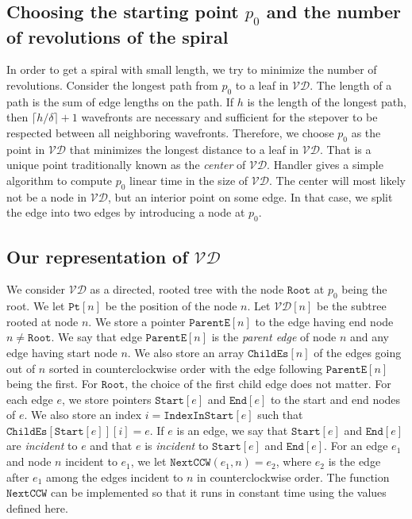 \documentclass[3p]{elsarticle}
\newcommand{\VD}{\mathcal{VD}}
\newcommand{\stepover}{\delta}
\newcommand{\parentEdge}{\texttt{ParentE}}
\newcommand{\childEdges}{\texttt{ChildEs}}
\newcommand{\nodeStart}{\texttt{Start}}
\newcommand{\nodeEnd}{\texttt{End}}
\newcommand{\indexInParentNode}{\texttt{IndexInStart}}
\newcommand{\getNextEdge}{\texttt{NextCCW}}
\newcommand{\rootNode}{\texttt{Root}}
\newcommand{\point}{\texttt{Pt}}
\begin{document}
\subsection{Choosing the starting point $p_0$ and the number of revolutions of the spiral}\label{startingPoint}

In order to get a spiral with small length, we try to minimize the number of revolutions.
Consider the longest path from $p_0$ to a leaf in $\VD$.
The length of a path is the sum of edge lengths on the path.
If $h$ is the length of the longest path, then $\lceil h/\stepover\rceil+1$ wavefronts
are necessary and sufficient for the stepover to be respected between all neighboring wavefronts.
Therefore, we choose $p_0$ as the point in $\VD$ that minimizes the longest distance to a leaf in
$\VD$. That is a unique point traditionally known as the \emph{center} of $\VD$.
Handler \cite{handler1973} gives a simple algorithm to compute $p_0$ linear time in the size of
$\VD$.
The center will most likely not be a node in $\VD$, but an interior point on some edge. In that
case, we split the edge into two edges by introducing a node at $p_0$.

\subsection{Our representation of $\VD$}

We consider $\VD$ as a directed, rooted tree with the node $\rootNode$ at $p_0$ being the root.
We let $\point[n]$ be the position of the node $n$. Let
$\VD[n]$ be the subtree rooted at node $n$.
We store a pointer $\parentEdge[n]$ to the edge having end node $n\neq \rootNode$.
We say that edge $\parentEdge[n]$ is the \emph{parent edge} of node $n$ and any edge
having start node $n$.
We also store an array
$\childEdges[n]$ of the edges going out of $n$ sorted in counterclockwise order with the
edge following $\parentEdge[n]$ being the first. For $\rootNode$, the choice of the first child
edge does not matter.
For each edge $e$, we store pointers $\nodeStart[e]$ and $\nodeEnd[e]$ to 
the start and end nodes of $e$. We also store an index $i = \indexInParentNode[e]$
such that $\childEdges[\nodeStart[e]][i]=e$. If $e$ is an edge, we say that $\nodeStart[e]$
and $\nodeEnd[e]$ are \emph{incident} to $e$ and that $e$ is \emph{incident} to
$\nodeStart[e]$ and $\nodeEnd[e]$.
For an edge $e_1$ and node $n$ incident to $e_1$,
we let $\getNextEdge(e_1,n)=e_2$,
where $e_2$ is the edge after $e_1$ among the edges incident to $n$ in counterclockwise
order. The function $\getNextEdge$ can be implemented so that it runs in constant time
using the values defined here.
\end{document}
